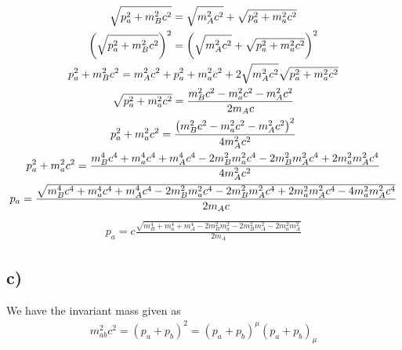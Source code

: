 \documentclass[12p,a4paper]{article}
\begin{document}
\begin{gather*}
    \sqrt{p_a^2 + m_B^2c^2} = \sqrt{m_A^2c^2} + \sqrt{p_a^2 + m_a^2c^2} \\
    \qty(\sqrt{p_a^2 + m_B^2c^2})^2 = \qty(\sqrt{m_A^2c^2} + \sqrt{p_a^2 + m_a^2c^2})^2 \\
    p_a^2 + m_B^2c^2 = m_A^2c^2 + p_a^2 + m_a^2c^2 + 2\sqrt{m_A^2c^2}\sqrt{p_a^2 + m_a^2c^2} \\
    \sqrt{p_a^2 + m_a^2c^2} = \frac{m_B^2c^2 - m_a^2c^2 - m_A^2c^2}{2m_Ac} \\
    p_a^2 + m_a^2c^2 = \frac{\qty(m_B^2c^2 - m_a^2c^2 - m_A^2c^2)^2}{4m_A^2c^2} \\
    p_a^2 + m_a^2c^2 = \frac{m_B^4c^4 + m_a^4c^4 + m_A^4c^4 - 2m_B^2m_a^2c^4 - 2m_B^2m_A^2c^4 + 2m_a^2m_A^2c^4}{4m_A^2c^2} \\
    p_a = \frac{\sqrt{m_B^4c^4 + m_a^4c^4 + m_A^4c^4 - 2m_B^2m_a^2c^4 - 2m_B^2m_A^2c^4 + 2m_a^2m_A^2c^4 - 4m_a^2m_A^2c^4}}{2m_Ac}
\end{gather*}
\begin{gather}\label{eqn:p_a}
    p_a = c\frac{\sqrt{m_B^4 + m_a^4 + m_A^4 - 2m_B^2m_a^2 - 2m_B^2m_A^2 - 2m_a^2m_A^2}}{2m_A}
\end{gather}


\subsection*{c)}
We have the invariant mass given as
\begin{gather*}
    m_{ab}^2c^2 = (p_a + p_b)^2 = (p_a + p_b)^\mu (p_a + p_b)_\mu
\end{gather*}
\end{document}
